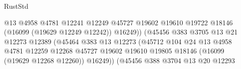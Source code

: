 \begin{lexlean}{RustStd}
\begin{coremodule}
                                                    @13
                                                    @4958
                                                    @4781
                                                    @12241
                                                    @12249
                                                    @45727
                                                    @19602
                                                    @19610
                                                    @19722
                                                    @18146
                                                    (@16099 (@19629 @12249 @12242))
                                                    @16249))
                                                (@45456
                                                  @383
                                                  @3705
                                                  @13
                                                  @21
                                                  @12273
                                                  @12389
                                                  (@45464
                                                    @383
                                                    @13
                                                    @12273
                                                    (@45712
                                                      @104
                                                      @24
                                                      @13
                                                      @4958
                                                      @4781
                                                      @12259
                                                      @12268
                                                      @45727
                                                      @19602
                                                      @19610
                                                      @19805
                                                      @18146
                                                      (@16099 (@19629 @12268 @12260))
                                                      @16249))
                                                  (@45456
                                                    @388
                                                    @3704
                                                    @13
                                                    @20
                                                    @12293

\end{coremodule}
\end{lexlean}
